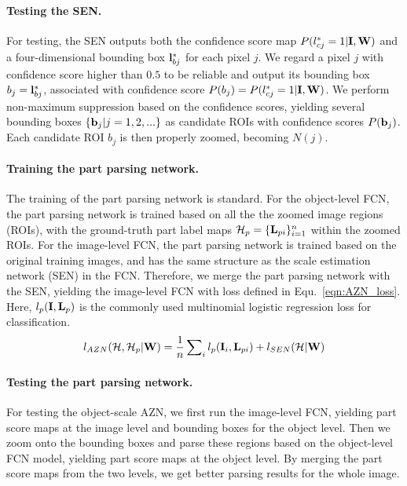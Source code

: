 \paragraph{\textbf{Testing the SEN.}}
For testing, the SEN outputs both the confidence score map $P(l_{cj}^*=1|{\mathbf I}, {\mathbf W})$ and a four-dimensional bounding box ${\mathbf l}_{bj}^*$ for each pixel $j$.
We regard a pixel $j$ with confidence score higher than $0.5$ to be reliable and output its bounding box $b_j = {\mathbf l}_{bj}^*$, associated with confidence score
$P(b_j) = P(l_{cj}^*=1|{\mathbf I}, {\mathbf W})$. We perform non-maximum suppression based on the confidence scores,
yielding several bounding boxes $\{{\mathbf b}_j | j=1,2,...\}$ as candidate ROIs with confidence scores $P({\mathbf b}_j)$.
Each candidate ROI $b_j$ is then properly zoomed, becoming $N(j)$.

\paragraph{\textbf{Training the part parsing network.}}
The training of the part parsing network is standard. For the object-level FCN, the part parsing network is trained based on all the the zoomed image regions (ROIs),
with the ground-truth part label maps ${\mathcal H_p} = \{{\mathbf L}_{pi}\}_{i=1}^{n}$ within the zoomed ROIs.
For the image-level FCN, the part parsing network is trained based on the original training images, and has the same structure as the scale estimation network (SEN) in the FCN.
Therefore, we merge the part parsing network with the SEN, yielding the image-level FCN with loss defined in Equ.~\ref{eqn:AZN_loss}.
Here, $l_{p}({\mathbf I}, {\mathbf L}_{p})$ is the commonly used multinomial logistic regression loss for classification.
\begin{align}
\label{eqn:AZN_loss}
l_{AZN}({\mathcal H},{\mathcal H_p}|{\mathbf W}) =\frac{1}{n}\sum\nolimits_il_{p}({\mathbf I}_i, {\mathbf L}_{pi}) + l_{SEN}({\mathcal H}|{\mathbf W})
\end{align}

\paragraph{\textbf{Testing the part parsing network.}}
For testing the object-scale AZN, we first run the image-level FCN, yielding part score maps at the image level and bounding boxes for the object level.
Then we zoom onto the bounding boxes and parse these regions based on the object-level FCN model, yielding part score maps at the object level.
By merging the part score maps from the two levels, we get better parsing results for the whole image.

